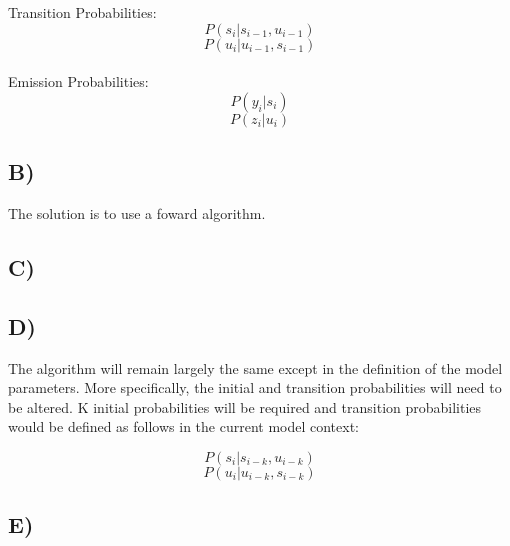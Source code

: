 \documentclass{report}
\begin{document}
Transition Probabilities:
\begin{equation}
  P(s_i | s_{i-1}, u_{i-1})
\end{equation}
\begin{equation}
  P(u_i | u_{i-1}, s_{i-1})
\end{equation}\\

Emission Probabilities:
\begin{equation}
  P(y_i | s_i)
\end{equation}
\begin{equation}
  P(z_i | u_i)
\end{equation}

\subsection*{B)}
The solution is to use a foward algorithm.

\subsection*{C)}

\subsection*{D)}
The algorithm will remain largely the same except in the definition of the model
parameters. More specifically, the initial and transition probabilities will need
to be altered. K initial probabilities will be required and transition probabilities
would be defined as follows in the current model context:

\begin{equation}
  P(s_i | s_{i-k}, u_{i-k})
\end{equation}
\begin{equation}
  P(u_i | u_{i-k}, s_{i-k})
\end{equation}
\subsection*{E)}
\end{document}
